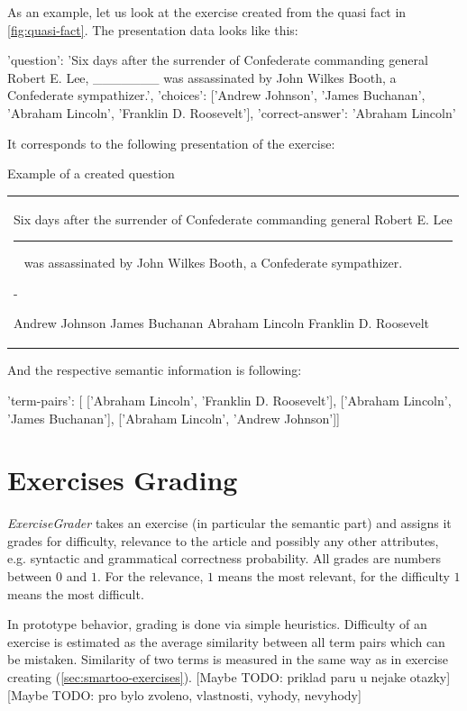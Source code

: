 \documentclass[a4paper, 12pt, twoside]{fithesis2}		%
\renewcommand{\_}{\leavevmode \kern0.07em\vbox{\hrule width0.4em}}
\newcounter{choice}
\renewcommand\thechoice{\Alph{choice}}
\newcommand\choicelabel{\thechoice.}
\newenvironment{choices}%
  {\vspace{0.8em}\list{\choicelabel}%
     {\usecounter{choice}\def\makelabel##1{\hss\llap{##1}}%
       \settowidth{\leftmargin}{W.\hskip\labelsep\hskip 0.01em}%
       \def\choice{%
         \item
       } %
       \labelwidth\leftmargin\advance\labelwidth-\labelsep
       \topsep=0pt
       \partopsep=0pt
     }%
  }%
  {\vspace{-0.7em}\endlist}
\newenvironment{question}
{
  \begin{center}
  \vspace{-0.5em}
  \begin{tabular}{p{0.9\textwidth}}
}
{
  \\
  \end{tabular}
  \vspace{-1em}
  \end{center}
}
\newcommand{\sentenceGap}{\rule{1.5cm}{0.4pt}~}
\begin{document}
As an example, let us look at the exercise created from the quasi fact in \autoref{fig:quasi-fact}. The presentation data looks like this:
\begin{code}
{'question': 'Six days after the surrender of Confederate commanding
              general Robert E. Lee, _______ was assassinated by
              John Wilkes Booth, a Confederate sympathizer.',
'choices': ['Andrew Johnson', 'James Buchanan',
            'Abraham Lincoln', 'Franklin D. Roosevelt'],
'correct-answer': 'Abraham Lincoln'}
\end{code}
It corresponds to the following presentation of the exercise:
\begin{exercise}
\label{exrc:assassination}
\caption{Example of a created question}
  \begin{question}
  Six days after the surrender of Confederate commanding general Robert E. Lee
  \sentenceGap
  was assassinated by John Wilkes Booth, a Confederate sympathizer.

  \begin{choices}
    \choice Andrew Johnson
    \choice James Buchanan
    \choice Abraham Lincoln
    \choice Franklin D. Roosevelt
  \end{choices}
  \end{question}
\end{exercise}

And the respective semantic information is following:
\begin{code}
{'term-pairs': [
    ['Abraham Lincoln', 'Franklin D. Roosevelt'],
    ['Abraham Lincoln', 'James Buchanan'],
    ['Abraham Lincoln', 'Andrew Johnson']]}
\end{code}

\section{Exercises Grading}
\label{sec:smartoo-exercises-grading}

\textit{ExerciseGrader} takes an exercise (in particular the semantic part) and assigns it grades for difficulty, relevance to the article and possibly any other attributes, e.g. syntactic and grammatical correctness probability. All grades are numbers between $0$ and $1$. For the relevance, $1$ means the most relevant, for the difficulty $1$ means the most difficult.

In prototype behavior, grading is done via simple heuristics.
Difficulty of an exercise is estimated as the average similarity between all term pairs which can be mistaken.
Similarity of two terms is measured in the same way as in exercise creating (\autoref{sec:smartoo-exercises}).
[Maybe TODO: priklad paru u nejake otazky] [Maybe TODO: pro bylo zvoleno, vlastnosti, vyhody, nevyhody]
\end{document}

